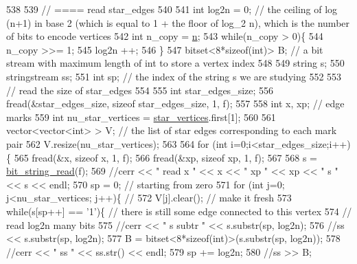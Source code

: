 \begin{DoxyCode}
538 
539   \textcolor{comment}{// ==== read star\_edges}
540 
541   \textcolor{keywordtype}{int} log2n = 0; \textcolor{comment}{// the ceiling of log (n+1) in base 2 (which is equal to 1 + the floor of log\_2 n), which
       is the number of bits to encode vertices}
542   \textcolor{keywordtype}{int} n\_copy = \hyperlink{classmarked__graph__compressed_a8d841016ddb11cfd33748c8deb6277ba}{n};
543   \textcolor{keywordflow}{while}(n\_copy > 0)\{
544     n\_copy >>= 1;
545     log2n ++;
546   \}
547   bitset<8*sizeof(int)> B; \textcolor{comment}{// a bit stream with maximum length of int to store a vertex index}
548 
549   \textcolor{keywordtype}{string} s;
550   stringstream ss;
551   \textcolor{keywordtype}{int} sp; \textcolor{comment}{// the index of the string s we are studying }
552 
553   \textcolor{comment}{// read the size of star\_edges}
554 
555   \textcolor{keywordtype}{int} star\_edges\_size;
556   fread(&star\_edges\_size, \textcolor{keyword}{sizeof} star\_edges\_size, 1, f);
557 
558   \textcolor{keywordtype}{int} x, xp; \textcolor{comment}{// edge marks}
559   \textcolor{keywordtype}{int} nu\_star\_vertices = \hyperlink{classmarked__graph__compressed_a7a4ced4586e2e353f9076bd447df5208}{star\_vertices}.first[1];
560 
561   vector<vector<int> > V; \textcolor{comment}{// the list of star edges corresponding to each mark pair}
562   V.resize(nu\_star\_vertices);
563 
564   \textcolor{keywordflow}{for} (\textcolor{keywordtype}{int} i=0;i<star\_edges\_size;i++)\{
565     fread(&x, \textcolor{keyword}{sizeof} x, 1, f);
566     fread(&xp, \textcolor{keyword}{sizeof} xp, 1, f);
567   
568     s = \hyperlink{compression__helper_8cpp_a40e8dcbc036f96b28e003e882c4890b7}{bit\_string\_read}(f);
569     \textcolor{comment}{//cerr << " read  x " << x << " xp " << xp << " s " << s << endl;}
570     sp = 0; \textcolor{comment}{// starting from zero }
571     \textcolor{keywordflow}{for} (\textcolor{keywordtype}{int} j=0; j<nu\_star\_vertices; j++)\{ \textcolor{comment}{// }
572       V[j].clear(); \textcolor{comment}{// make it fresh}
573       \textcolor{keywordflow}{while}(s[sp++] == \textcolor{charliteral}{'1'})\{ \textcolor{comment}{// there is still some edge connected to this vertex }
574         \textcolor{comment}{// read log2n many bits}
575         \textcolor{comment}{//cerr << " s subtr " << s.substr(sp, log2n);}
576         \textcolor{comment}{//ss << s.substr(sp, log2n);}
577         B = bitset<8*sizeof(int)>(s.substr(sp, log2n));
578         \textcolor{comment}{//cerr << " ss " << ss.str() << endl;}
579         sp += log2n;
580         \textcolor{comment}{//ss >> B;}

\end{DoxyCode}
